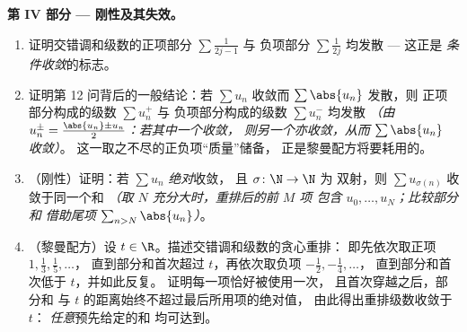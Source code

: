 \begin{problem}[{周末问题 --- $H_n = \ln n + \gamma +
\frac{1}{2n} + O(n^{-2})$，并将 $1 - \frac12 +
\frac13 - \dots$ 重排为 $\frac{\ln 2}{2}$}]
\medskip
\noindent\textbf{第 IV 部分 --- 刚性及其失效。}
\begin{enumerate}[resume]
  \item 证明交错调和级数的正项部分 $\sum \frac{1}{2j-1}$ 与
        负项部分 $\sum \frac{1}{2j}$ 均发散 ---
        这正是
        \emph{条件收敛}的标志。
  \item 证明第 12 问背后的一般结论：若
        $\sum u_n$ 收敛而 $\sum \abs{u_n}$ 发散，则
        正项部分构成的级数 $\sum u_n^+$ 与
        负项部分构成的级数 $\sum u_n^-$ 均发散 \emph{（由
        $u_n^\pm = \frac{\abs{u_n} \pm u_n}{2}$：若其中一个收敛，
        则另一个亦收敛，从而 $\sum\abs{u_n}$ 收敛）}。
        这一取之不尽的正负项“质量”储备，
        正是黎曼配方将要耗用的。
  \item （刚性）证明：若 $\sum u_n$ \emph{绝对}收敛，
        且 $\sigma \colon \N \to \N$ 为
        双射，则 $\sum u_{\sigma(n)}$ 收敛于同一个和
        \emph{（取 $N$ 充分大时，重排后的前 $M$ 项
        包含 $u_0, \dots, u_N$；比较部分和
        借助尾项 $\sum_{n > N}\abs{u_n}$）}。
  \item （黎曼配方）设 $t \in \R$。描述交错调和级数的贪心重排：
        即先依次取正项 $1, \frac13, \frac15, \dots$，
        直到部分和首次超过 $t$，再依次取负项 $-\frac12, -\frac14, \dots$，
        直到部分和首次低于 $t$，并如此反复。
        证明每一项恰好被使用一次，
        且首次穿越之后，部分和
        与 $t$ 的距离始终不超过最后所用项的绝对值，
        由此得出重排级数收敛于 $t$：
        \emph{任意}预先给定的和
        均可达到。
\end{enumerate}


\end{problem}
